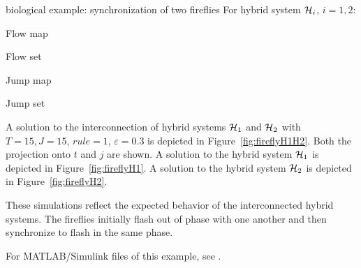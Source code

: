 \begin{example}{biological example: synchronization of two fireflies}
For hybrid system $\mathcal{H}_i$, $i = 1,2$:

Flow map
\label{scr:f}

Flow set
\label{scr:C}

Jump map
\label{scr:g}

Jump set
\label{scr:D}

A solution to the interconnection of hybrid systems $\mathcal{H}_1$ and
$\mathcal{H}_2$ with $T=15, J=15$, $rule =1$, $\varepsilon=0.3$ is depicted in Figure~\ref{fig:fireflyH1H2}. Both the projection onto $t$ and $j$ are shown. A solution to the hybrid system $\mathcal{H}_1$ is depicted in Figure~\ref{fig:fireflyH1}. A solution to the hybrid system $\mathcal{H}_2$ is depicted in Figure~\ref{fig:fireflyH2}.

These simulations reflect the expected behavior of the interconnected hybrid systems. The fireflies initially flash out of phase with one another and then synchronize to flash in the same phase.

For MATLAB/Simulink files of this example, see .

\end{example}



